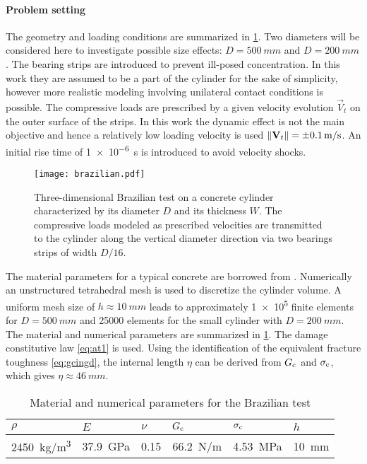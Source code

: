 \paragraph{Problem setting} The geometry and loading conditions are summarized in \cref{fig:brazilian}. Two diameters will be considered here to investigate possible size effects: $D=\SI{500}{mm}$ and $D=\SI{200}{mm}$. The bearing strips are introduced to prevent ill-posed concentration. In this work they are assumed to be a part of the cylinder for the sake of simplicity, however more realistic modeling involving unilateral contact conditions is possible. The compressive loads are prescribed by a given velocity evolution $\vec{V}_t$ on the outer surface of the strips. In this work the dynamic effect is not the main objective and hence a relatively low loading velocity is used $\norm{\vec{V}_t}=\SI{\pm 0.1}{m/s}$. An initial rise time of \SI{1e-6}{s} is introduced to avoid velocity shocks.
\begin{figure}[htbp]
\centering
\texttt{[image: brazilian.pdf]}
\caption{Three-dimensional Brazilian test on a concrete cylinder characterized by its diameter $D$ and its thickness $W$. The compressive loads modeled as prescribed velocities are transmitted to the cylinder along the vertical diameter direction via two bearings strips of width $D/16$.} \label{fig:brazilian}
\end{figure}
The material parameters for a typical concrete are borrowed from \cite{RuizOrtizPandolfi:2000}. Numerically an unstructured tetrahedral mesh is used to discretize the cylinder volume. A uniform mesh size of $h\approx\SI{10}{mm}$ leads to approximately \num{1e5} finite elements for $D=\SI{500}{mm}$ and \num{25000} elements for the small cylinder with $D=\SI{200}{mm}$. The material and numerical parameters are summarized in \cref{tab:brazilian}. The damage constitutive law \eqref{eq:at1} is used. Using the identification of the equivalent fracture toughness \eqref{eq:gcingd}, the internal length $\eta$ can be derived from $G_\mathrm{c}$ and $\sigma_{\mathrm{c}}$, which gives $\eta\approx \SI{46}{mm}$.
\begin{table}[htbp]
\centering
\caption{Material and numerical parameters for the Brazilian test} \label{tab:brazilian}
\begin{tabular}{llllll} \toprule
$\rho$ & $E$ & $\nu$ & $G_\mathrm{c}$ & $\sigma_{\mathrm{c}}$ & $h$ \\ \midrule
\SI{2450}{kg/m^3} & \SI{37.9}{GPa} & 0.15 & \SI{66.2}{N/m} & \SI{4.53}{MPa} & \SI{10}{mm} \\ \bottomrule
\end{tabular}
\end{table}

